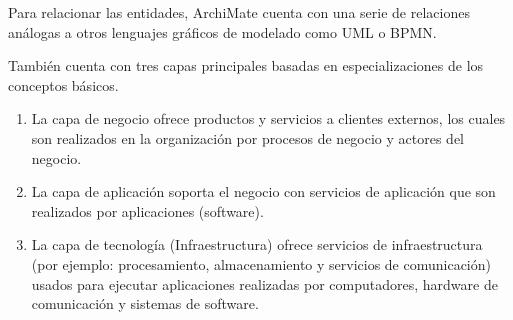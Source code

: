 Para relacionar las entidades, ArchiMate cuenta con una serie de relaciones análogas a otros lenguajes gráficos de modelado como UML o BPMN.

También cuenta con tres capas principales basadas en especializaciones de los conceptos básicos. 

\begin{enumerate}

\item La capa de negocio ofrece productos y servicios a clientes  externos, los cuales son realizados en la organización por procesos de negocio y actores del negocio.

\item La capa de aplicación soporta el negocio con servicios de aplicación que son realizados por aplicaciones (software).

\item La capa de tecnología (Infraestructura) ofrece servicios de infraestructura (por ejemplo: procesamiento, almacenamiento y servicios de comunicación) usados para ejecutar aplicaciones realizadas por computadores, hardware de comunicación y sistemas de software.

\end{enumerate}



